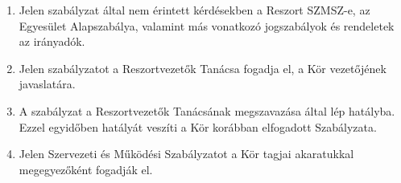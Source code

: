 \documentclass[12pt]{article}
\begin{document}
\begin{enumerate}
\item Jelen szabályzat által nem érintett kérdésekben a Reszort SZMSZ-e, az Egyesület Alapszabálya, valamint más vonatkozó jogszabályok és rendeletek az irányadók.
\item Jelen szabályzatot a Reszortvezetők Tanácsa fogadja el, a Kör vezetőjének javaslatára.
\item A szabályzat a Reszortvezetők Tanácsának megszavazása által lép hatályba. Ezzel egyidőben hatályát veszíti a Kör korábban elfogadott Szabályzata.
\item Jelen Szervezeti és Működési Szabályzatot a Kör tagjai akaratukkal megegyezőként fogadják el.
\end{enumerate}

\end{document}
